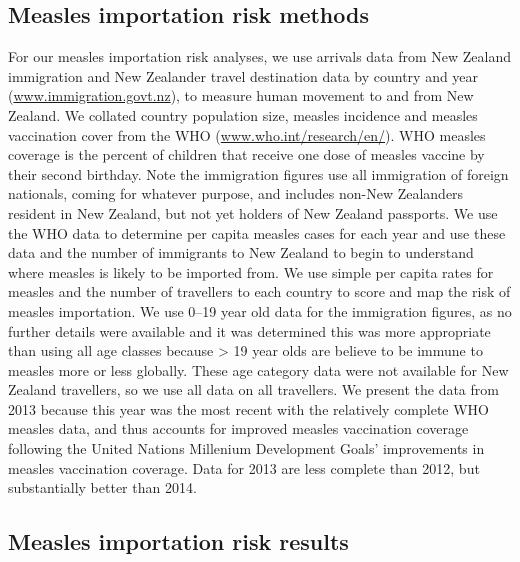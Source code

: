 \documentclass{article}
\begin{document}
\subsection{Measles importation risk methods}
\label{sub:imp_risk}
For our measles importation risk analyses, we use arrivals data from New Zealand immigration and New Zealander travel destination data by country and year (\href{http://www.immigration.govt.nz/}{www.immigration.govt.nz}), to measure human movement to and from New Zealand. We collated country population size, measles incidence and measles vaccination cover from the WHO (\href{http://www.who.int/research/en/}{www.who.int/research/en/}). WHO measles coverage is the percent of children that receive one dose of measles vaccine by their second birthday. Note the immigration figures use all immigration of foreign nationals, coming for whatever purpose, and includes non-New Zealanders resident in New Zealand, but not yet holders of New Zealand passports. We use the WHO data to determine per capita measles cases for each year and use these data and the number of immigrants to New Zealand to begin to understand where measles is likely to be imported from. We use simple per capita rates for measles and the number of travellers to each country to score and map the risk of measles importation. We use 0--19 year old data for the immigration figures, as no further details were available and it was determined this was more appropriate than using all age classes because > 19 year olds are believe to be immune to measles more or less globally. These age category data were not available for New Zealand travellers, so we use all data on all travellers. We present the data from 2013 because this year was the most recent with the relatively complete WHO measles data, and thus accounts for improved measles vaccination coverage following the United Nations Millenium Development Goals' improvements in measles vaccination coverage. Data for 2013 are less complete than 2012, but substantially better than 2014.

\subsection{Measles importation risk results}
\end{document}
